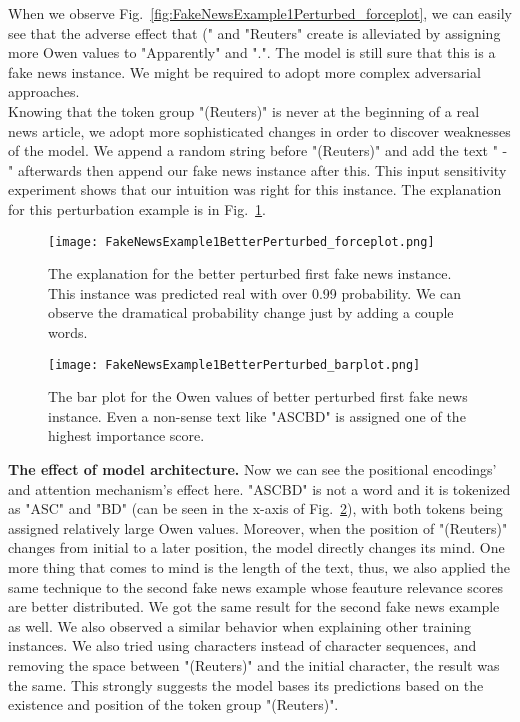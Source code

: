 When we observe Fig.~\ref{fig:FakeNewsExample1Perturbed_forceplot}, we can easily see that the adverse effect that (" and "Reuters" create is alleviated by assigning more Owen values to "Apparently" and ".". The model is still sure that this is a fake news instance. We might be required to adopt more complex adversarial approaches.\\
Knowing that the token group "(Reuters)" is never at the beginning of a real news article, we adopt more sophisticated changes in order to discover weaknesses of the model. We append a random string before "(Reuters)" and add the text " - " afterwards then append our fake news instance after this. This input sensitivity experiment shows that our intuition was right for this instance. The explanation for this perturbation example is in Fig.~\ref{fig:FakeNewsExample1BetterPerturbed_forceplot}.\\
\begin{figure}
    \centering
    \texttt{[image: FakeNewsExample1BetterPerturbed\_forceplot.png]}
    \caption[The explanation for the better perturbed first fake news instance.]{The explanation for the better perturbed first fake news instance. This instance was predicted real with over 0.99 probability. We can observe the dramatical probability change just by adding a couple words.}
    \label{fig:FakeNewsExample1BetterPerturbed_forceplot}
\end{figure}
\begin{figure}
    \centering
    \texttt{[image: FakeNewsExample1BetterPerturbed\_barplot.png]}
    \caption[The bar plot for the Owen values of better perturbed first fake news instance.]{The bar plot for the Owen values of better perturbed first fake news instance. Even a non-sense text like "ASCBD" is assigned one of the highest importance score.}
    \label{fig:FakeNewsExample1BetterPerturbed_barplot}
\end{figure}
\textbf{The effect of model architecture.} Now we can see the positional encodings' and attention mechanism's effect here. "ASCBD" is not a word and it is tokenized as "ASC" and "BD" (can be seen in the x-axis of Fig.~\ref{fig:FakeNewsExample1BetterPerturbed_barplot}), with both tokens being assigned relatively large Owen values. Moreover, when the position of "(Reuters)" changes from initial to a later position, the model directly changes its mind. One more thing that comes to mind is the length of the text, thus, we also applied the same technique to the second fake news example whose feauture relevance scores are better distributed. We got the same result for the second fake news example as well. We also observed a similar behavior when explaining other training instances. We also tried using characters instead of character sequences, and removing the space between "(Reuters)" and the initial character, the result was the same. This strongly suggests the model bases its predictions based on the existence and position of the token group "(Reuters)".\\
